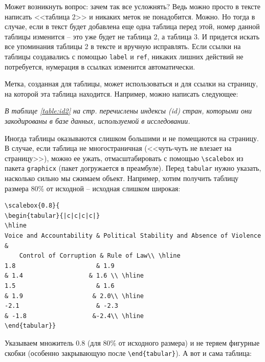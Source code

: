 \documentclass[12pt]{article}
\begin{document}
Может возникнуть вопрос: зачем так все усложнять? Ведь можно просто в тексте написать <<таблица 2>> и никаких меток не понадобится. Можно. Но тогда в случае, если в текст будет добавлена еще одна таблица перед этой, номер данной таблицы изменится -- это уже будет не таблица 2, а таблица 3. И придется искать все упоминания таблицы 2 в тексте и вручную исправлять. Если ссылки на таблицы создавались с помощью \texttt{label} и \texttt{ref}, никаких лишних действий не потребуется, нумерация в ссылках изменится автоматически.

Метка, созданная для таблицы, может использоваться и для ссылки на страницу, на которой эта таблица находится. Например, можно написать следующее: 
\begin{center}
\textit{В таблице \ref{table:id2} на стр. \pageref{table:id2} перечислены индексы (id) стран, которыми они закодированы в базе данных, используемой в исследовании.}
\end{center}

Иногда таблицы оказываются слишком большими и не помещаются на страницу. В случае, если таблица не многостраничная (<<чуть-чуть не влезает на страницу>>), можно ее ужать, отмасштабировать с помощью \texttt{\textbackslash scalebox} из пакета \texttt{graphicx} (пакет догружается в преамбуле). Перед \texttt{tabular} нужно указать, насколько сильно мы сжимаем объект. Например, хотим получить таблицу размера 80\% от исходной  -- исходная слишком широкая: \medskip\\

\begin{BVerbatim}
\scalebox{0.8}{
\begin{tabular}{|c|c|c|c|}
\hline
Voice and Accountability & Political Stability and Absence of Violence & 
	Control of Corruption & Rule of Law\\ \hline
1.8                      & 1.9                                         & 1.4                  & 1.6 \\ \hline
1.5                      & 1.6                                         & 1.9                   & 2.0\\ \hline
-2.1                     & -2.3                                        & -1.8                  &-2.4\\ \hline
\end{tabular}}
\end{BVerbatim}

Указываем множитель 0.8 (для 80\% от исходного размера) и не теряем фигурные скобки (особенно закрывающую после \texttt{\textbackslash end\{tabular\}}). А вот и сама таблица:
\end{document}
